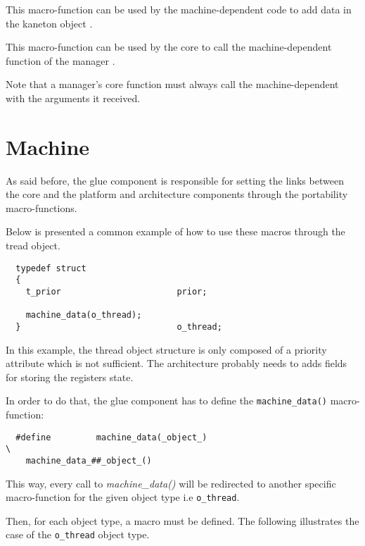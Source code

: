 	 {
	   This macro-function can be used by the machine-dependent code
	   to add data in the kaneton object .
	 }

	 {
	   This macro-function can be used by the core to call the
	   machine-dependent function  of the manager
	   .

	   \-

	   Note that a manager's core function must always call the
	   machine-dependent with the arguments it received.
	 }

%
%

\section{Machine}

As said before, the glue component is responsible for setting the links between
the core and the platform and architecture components through the portability
macro-functions.

Below is presented a common example of how to use these macros through
the tread object.

\begin{verbatim}
  typedef struct
  {
    t_prior                       prior;

    machine_data(o_thread);
  }                               o_thread;
\end{verbatim}

In this example, the thread object structure is only composed of a priority
attribute which is not sufficient. The architecture probably needs to
adds fields for storing the registers state.

In order to do that, the glue component has to define the
\texttt{machine\_data()} macro-function:

\begin{verbatim}
  #define         machine_data(_object_)                                  \
    machine_data_##_object_()
\end{verbatim}

This way, every call to \textit{machine\_data()} will be redirected to another
specific macro-function for the given object type i.e \texttt{o\_thread}.

Then, for each object type, a macro must be defined. The following
illustrates the case of the \texttt{o\_thread} object type.

